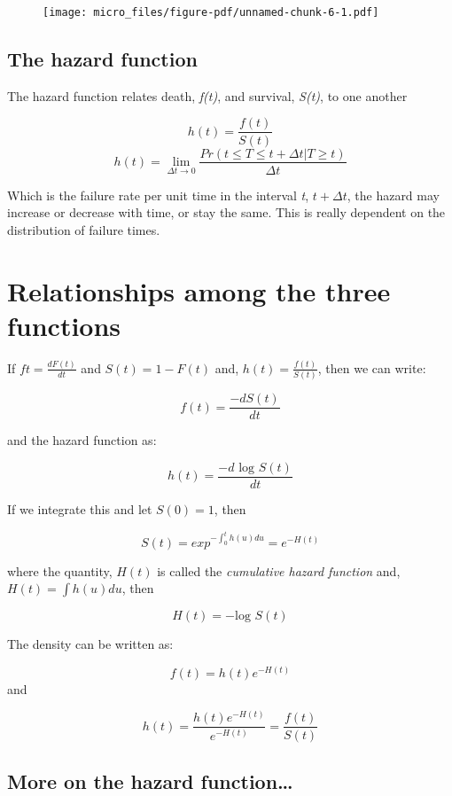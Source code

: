 \documentclass[
  letterpaper,
  DIV=11,
  numbers=noendperiod]{scrreprt}
\begin{document}
\begin{figure}[H]

{\centering \texttt{[image: micro\_files/figure-pdf/unnamed-chunk-6-1.pdf]}

}

\end{figure}

\hypertarget{the-hazard-function}{%
\subsection{The hazard function}\label{the-hazard-function}}

The hazard function relates death, \emph{f(t)}, and survival,
\emph{S(t)}, to one another

\[h(t) = \frac{f(t)}{S(t)}\]
\[h(t) = \lim_{\Delta t \rightarrow 0} \frac{Pr(t \leqslant T \leqslant t + \Delta t | T \geqslant t)}{\Delta t}\]

Which is the failure rate per unit time in the interval \emph{t},
\(t+\Delta t\), the hazard may increase or decrease with time, or stay
the same. This is really dependent on the distribution of failure times.

\hypertarget{relationships-among-the-three-functions}{%
\section{Relationships among the three
functions}\label{relationships-among-the-three-functions}}

If \(ft = \frac{dF(t)}{dt}\) and \(S(t) = 1- F(t)\) and,
\(h(t) = \frac{f(t)}{S(t)}\), then we can write:

\[f(t) = \frac{-dS(t)}{dt}\]

and the hazard function as:

\[h(t) = \frac{-d \text{ log } S(t)}{dt}\]

If we integrate this and let \(S(0)=1\), then

\[S(t) = exp^{-\int_{0}^t h(u) du} = e^{-H(t)}\]

where the quantity, \(H(t)\) is called the \emph{cumulative hazard
function} and, \(H(t) = \int h(u) du\), then

\[H(t) = -\text{log }  S(t)\]

The density can be written as:

\[f(t) = h(t) e ^{-H(t)}\] and

\[h(t) = \frac{h(t) e^{-H(t)}}{e^{-H(t)}} = \frac{f(t)}{S(t)}\]

\hypertarget{more-on-the-hazard-function}{%
\subsection{More on the hazard
function\ldots{}}\label{more-on-the-hazard-function}}
\end{document}
